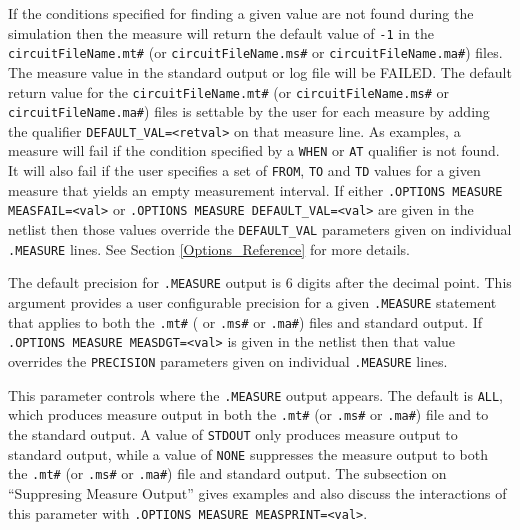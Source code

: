 \begin{Command}
\begin{Arguments}
If the conditions specified for finding a given value are not found during the simulation then
the measure will return the default value of {\tt -1} in the \texttt{circuitFileName.mt\#}
(or \texttt{circuitFileName.ms\#} or \texttt{circuitFileName.ma\#}) files.
The  measure value in the standard output or log file will be FAILED.  The default return value
for the  \texttt{circuitFileName.mt\#} (or \texttt{circuitFileName.ms\#} 
or \texttt{circuitFileName.ma\#}) files is settable by the
user for each measure by adding the qualifier {\tt DEFAULT\_VAL=<retval>} on that measure line.  As
examples, a measure will fail if the condition specified by a {\tt WHEN} or {\tt AT} qualifier is
not found.  It will also fail if the user specifies a set of {\tt FROM}, {\tt TO} and {\tt TD} 
values for a given measure that yields an empty measurement interval.  If either \texttt{.OPTIONS
MEASURE MEASFAIL=<val>} or \texttt{.OPTIONS MEASURE DEFAULT\_VAL=<val>} are given in the netlist 
then those values override the \texttt{DEFAULT\_VAL} parameters given on individual 
\texttt{.MEASURE} lines.  See Section \ref{Options_Reference} for more details.


The default precision for {\tt .MEASURE} output is 6 digits after the decimal point.  This 
argument provides a user configurable precision for a given {\tt .MEASURE} statement that 
applies to both the \texttt{.mt\#} ( or \texttt{.ms\#} or \texttt{.ma\#}) files and standard output.
If \texttt{.OPTIONS MEASURE MEASDGT=<val>} is given in the netlist then that value overrides 
the \texttt{PRECISION} parameters given on individual \texttt{.MEASURE} lines. 


This parameter controls where the {\tt .MEASURE} output appears.  The default is {\tt ALL}, 
which produces measure output in both the \texttt{.mt\#} (or \texttt{.ms\#} or 
\texttt{.ma\#}) file and to the standard output.  A value of {\tt STDOUT} only produces measure 
output to standard output, while a value of {\tt NONE} suppresses the measure output to both 
the \texttt{.mt\#} (or \texttt{.ms\#} or \texttt{.ma\#}) file and standard output. 
The subsection on ``Suppresing Measure Output'' gives examples and also discuss the interactions
of this parameter with \texttt{.OPTIONS MEASURE MEASPRINT=<val>}.



\end{Arguments}
\end{Command}
